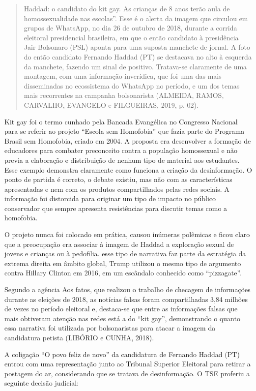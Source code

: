 \begin{quote}
Haddad: o candidato do kit gay. As crianças de 8 anos terão aula de
homossexualidade nas escolas''. Esse é o alerta da imagem que circulou
em grupos de WhatsApp, no dia 26 de outubro de 2018, durante a corrida
eleitoral presidencial brasileira, em que o então candidato à
presidência Jair Bolsonaro (PSL) aponta para uma suposta manchete de
jornal. A foto do então candidato Fernando Haddad (PT) se destacava no
alto à esquerda da manchete, fazendo um sinal de positivo. Tratava-se
claramente de uma montagem, com uma informação inverídica, que foi uma
das mais disseminadas no ecossistema do WhatsApp no período, e um dos
temas mais recorrentes na campanha bolsonarista (ALMEIDA, RAMOS,
CARVALHO, EVANGELO e FILGUEIRAS, 2019, p. 02).
\end{quote}

Kit gay foi o termo cunhado pela Bancada Evangélica no Congresso
Nacional para se referir ao projeto ``Escola sem Homofobia'' que fazia
parte do Programa Brasil sem Homofobia, criado em 2004. A proposta era
desenvolver a formação de educadores para combater preconceito contra a
população homossexual e não previa a elaboração e distribuição de nenhum
tipo de material aos estudantes. Esse exemplo demonstra claramente como
funciona a criação da desinformação. O ponto de partida é correto, o
debate existiu, mas não com as características apresentadas e nem com os
produtos compartilhados pelas redes sociais. A informação foi distorcida
para originar um tipo de impacto no público conservador que sempre
apresenta resistências para discutir temas como a homofobia.

O projeto nunca foi colocado em prática, causou inúmeras polêmicas e
ficou claro que a preocupação era associar à imagem de Haddad a
exploração sexual de jovens e crianças ou à pedofilia. esse tipo de
narrativa faz parte da estratégia da extrema direita em âmbito global,
Trump utilizou o mesmo tipo de argumento contra Hillary Clinton em 2016,
em um escândalo conhecido como ``pizzagate''.

Segundo a agência Aos fatos, que realizou o trabalho de checagem de
informações durante as eleições de 2018, as notícias falsas foram
compartilhadas 3,84 milhões de vezes no período eleitoral e, destaca-se
que entre as informações falsas que mais obtiveram atenção nas redes
está a do ``kit gay'', demonstrando o quanto essa narrativa foi
utilizada por bolsonaristas para atacar a imagem da candidatura petista
(LIBÓRIO e CUNHA, 2018).

A coligação ``O povo feliz de novo'' da candidatura de Fernando Haddad
(PT) entrou com uma representação junto ao Tribunal Superior Eleitoral
para retirar a postagem do ar, considerando que se tratava de
desinformação. O TSE proferiu a seguinte decisão judicial:

